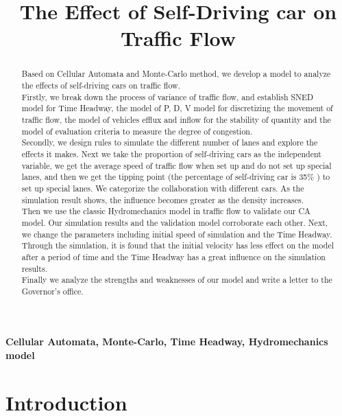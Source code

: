 \documentclass[UTF8]{mcmthesis}
\title{The Effect of Self-Driving car on Traffic Flow}
\date{}
\begin{document}
\begin{abstract}%

Based on Cellular Automata and Monte-Carlo method, we develop a model to analyze the effects of self-driving cars on traffic flow.\\
\indent Firstly, we break down the process of variance of traffic flow, and establish SNED model for Time Headway, the model of P, D, V model for discretizing the movement of traffic flow, the model of vehicles efflux and inflow for the stability of quantity and the model of evaluation criteria to measure the degree of congestion.\\
\indent Secondly, we design rules to simulate the different number of lanes and explore the effects it makes. Next we take the proportion of self-driving cars as the independent variable, we get the  average speed of traffic flow when set up and do not set up special lanes, and then we get the tipping point (the percentage of self-driving car is 35\% ) to set up special lanes. We categorize the collaboration with different cars. As the simulation result shows, the influence becomes greater as the density increases.\\
\indent Then we use the classic Hydromechanics model in traffic flow to validate our CA model. Our simulation results and the validation model corroborate each other. Next, we change the parameters including initial speed of simulation and the Time Headway. Through the simulation, it is found that the initial velocity has less effect on the model after a period of time and the Time Headway has a great influence on the simulation results.  \\
\indent Finally we analyze the strengths and weaknesses of our model and write a letter to the Governor's office.

\end{abstract}


\begin{keywords}
	\textbf{Cellular Automata, Monte-Carlo, Time Headway,  Hydromechanics model}
\end{keywords}
\maketitle
\tableofcontents\thispagestyle{empty}
\newpage

\setcounter{page}{1}
\section{Introduction}
\end{document}
